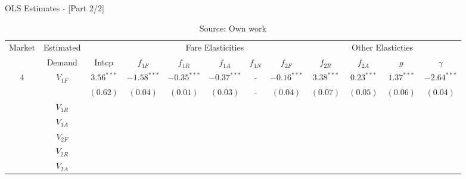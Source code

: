 
\begin{table}[!ht] \centering 
  \caption{OLS Estimates - [Part 2/2]} 
  \label{tbl:ols} 
{\renewcommand\arraystretch{1.25}}
\begin{tabular} {c c cccccccc cc}
\toprule
\multirow{2}{*}{Market} & Estimated  & \multicolumn{7}{c}{Fare Elasticities}                                   & \multicolumn{2}{c}{Other Elasticties} \\
						& Demand     & Intcp & $f_{1F}$ & $f_{1R}$ & $f_{1A}$ & $f_{1N}$ & $f_{2F}$ & $f_{2R}$ & $f_{2A}$ & $g$ & $\gamma$ \\ 
\hline
\multirow{12}{*}{4}      & \multirow{2}{*}{$V_{1F}$}  &$3.56^{***}$ &$-1.58^{***}$&$-0.35^{***}$& $-0.37^{***}$& - & $-0.16^{***}$& $3.38^{***}$& $0.23^{***}$& $1.37^{***}$& $-2.64^{***}$\\
						&							  &$(0.62)$&$(0.04)$&$(0.01)$ &$(0.03)$ & - & $(0.04)$ &$(0.07)$ &$(0.05)$ &$(0.06)$ &$(0.04)$ \\
						& \multirow{2}{*}{$V_{1R}$}   & & & & & & & & & \\
													  & & & & & & & & & \\
						& \multirow{2}{*}{$V_{1A}$}   & & & & & & & & & \\
													  & & & & & & & & & \\
						& \multirow{2}{*}{$V_{2F}$}   & & & & & & & & & \\
													  & & & & & & & & & \\
						& \multirow{2}{*}{$V_{2R}$}   & & & & & & & & & \\
													  & & & & & & & & & \\
						& \multirow{2}{*}{$V_{2A}$}   & & & & & & & & & \\
													  & & & & & & & & & \\
\bottomrule
\end{tabular}%
\caption*{Source: Own work}
\end{table} 
